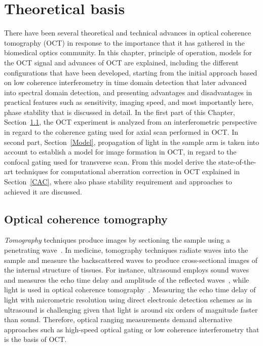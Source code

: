 \newpage
{}
\chapter{Theoretical basis}\label{chap:theory}

There have been several theoretical and technical advances in optical coherence tomography (OCT) in response to the importance that it has gathered in the biomedical optics community. In this chapter, principle of operation, models for the OCT signal and advances of OCT are explained, including the different configurations that have been developed, starting from the initial approach based on low coherence interferometry in time domain detection that later advanced into spectral domain detection, and presenting advantages and disadvantages in practical features such as sensitivity, imaging speed, and most importantly here, phase stability that is discussed in detail. In the first part of this Chapter, Section~\ref{OCT}, the OCT experiment is analyzed from an interferometric perspective in regard to the coherence gating used for axial scan performed in OCT. In second part, Section~\ref{Model}, propagation of light in the sample arm is taken into account to establish a model for image formation in OCT, in regard to the confocal gating used for transverse scan. From this model derive the state-of-the-art techniques for computational aberration correction in OCT explained in Section~\ref{CAC}, where also phase stability requirement and approaches to achieved it are discussed.

\section{Optical coherence tomography}\label{OCT}

\textit{Tomography} techniques produce images by sectioning the sample using a penetrating wave~\cite{}. In medicine, tomography techniques radiate waves into the sample and measure the backscattered waves to produce cross-sectional images of the internal structure of tissues. For instance, ultrasound employs sound waves and measures the echo time delay and amplitude of the reflected waves~\cite{}, while light is used in optical coherence tomography~\cite{}. Measuring the echo time delay of light with micrometric resolution using direct electronic detection schemes as in ultrasound is challenging given that light is around six orders of magnitude faster than sound. Therefore, optical ranging measurements demand alternative approaches such as high-speed optical gating or low coherence interferometry that is the basis of OCT.

